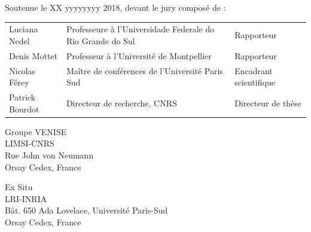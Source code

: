 \begin{titlepage}

Soutenue le XX yyyyyyyy 2018, devant le jury composé de :\\

\begin{center}
	\begin{tabular}{l l l}
	

Luciana Nedel		& Professeure à l'Universidade Federale do Rio Grande do Sul	& Rapporteur				\\
Denis Mottet		& Professeur à l'Université de Montpellier 	& Rapporteur				\\
				
Nicolas Férey		& Maître de conférences de l'Université Paris Sud									& Encadrant scientifique	\\
Patrick Bourdot 	& Directeur de recherche, CNRS								& Directeur de thèse		\\ 
		
	\end{tabular}
\end{center}


\setlength{\columnsep}{7mm}
\setlength{\columnseprule}{0pt}

\begin{multicols}{2} 
\small 
\noindent Groupe VENISE					\\	
\noindent LIMSI-CNRS					\\
\noindent Rue John von Neumann			\\
 Orsay Cedex, France		\\	

\columnbreak

\raggedleft Ex Situ										\\
\noindent LRI-INRIA										\\
\noindent Bât. 650 Ada Lovelace, Université Paris-Sud	\\
 Orsay Cedex, France
\end{multicols}



\end{titlepage}